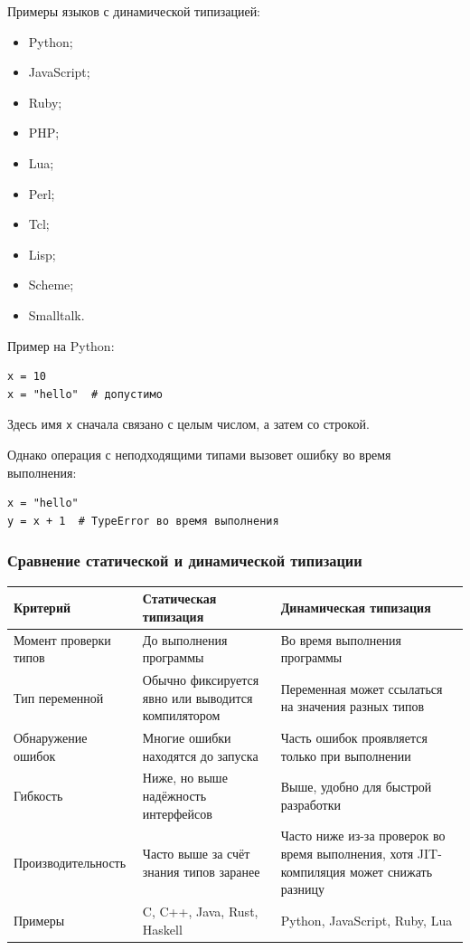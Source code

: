 \documentclass[12pt,a4paper]{article}
\begin{document}
Примеры языков с динамической типизацией:

\begin{itemize}
    \item Python;
    \item JavaScript;
    \item Ruby;
    \item PHP;
    \item Lua;
    \item Perl;
    \item Tcl;
    \item Lisp;
    \item Scheme;
    \item Smalltalk.
\end{itemize}

Пример на Python:

\begin{verbatim}
x = 10
x = "hello"  # допустимо
\end{verbatim}

Здесь имя \texttt{x} сначала связано с целым числом, а затем со строкой.

Однако операция с неподходящими типами вызовет ошибку во время выполнения:

\begin{verbatim}
x = "hello"
y = x + 1  # TypeError во время выполнения
\end{verbatim}

\subsubsection{Сравнение статической и динамической типизации}

\begin{center}
\begin{tabular}{|p{}|p{}|p{}|}
\hline
\textbf{Критерий} & \textbf{Статическая типизация} & \textbf{Динамическая типизация} \\
\hline
Момент проверки типов &
До выполнения программы &
Во время выполнения программы \\
\hline
Тип переменной &
Обычно фиксируется явно или выводится компилятором &
Переменная может ссылаться на значения разных типов \\
\hline
Обнаружение ошибок &
Многие ошибки находятся до запуска &
Часть ошибок проявляется только при выполнении \\
\hline
Гибкость &
Ниже, но выше надёжность интерфейсов &
Выше, удобно для быстрой разработки \\
\hline
Производительность &
Часто выше за счёт знания типов заранее &
Часто ниже из-за проверок во время выполнения, хотя JIT-компиляция может снижать разницу \\
\hline
Примеры &
C, C++, Java, Rust, Haskell &
Python, JavaScript, Ruby, Lua \\
\hline
\end{tabular}
\end{center}
\end{document}
